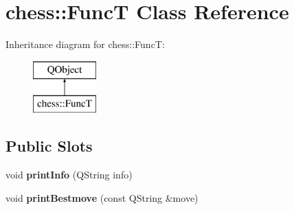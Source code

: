 \hypertarget{classchess_1_1FuncT}{\section{chess\-:\-:Func\-T Class Reference}
\label{classchess_1_1FuncT}
}
Inheritance diagram for chess\-:\-:Func\-T\-:\begin{figure}[H]
\begin{center}
\leavevmode
\includegraphics[height=2.000000cm]{classchess_1_1FuncT}
\end{center}
\end{figure}
\subsection*{Public Slots}
\begin{DoxyCompactItemize}
\item 
\hypertarget{classchess_1_1FuncT_a88ae07450073354a6fe3561020f5990a}{void {\bfseries print\-Info} (Q\-String info)}\label{classchess_1_1FuncT_a88ae07450073354a6fe3561020f5990a}

\item 
\hypertarget{classchess_1_1FuncT_a519de891915d878ff5ddd0aacbe46571}{void {\bfseries print\-Bestmove} (const Q\-String \&move)}\label{classchess_1_1FuncT_a519de891915d878ff5ddd0aacbe46571}

\end{DoxyCompactItemize}
